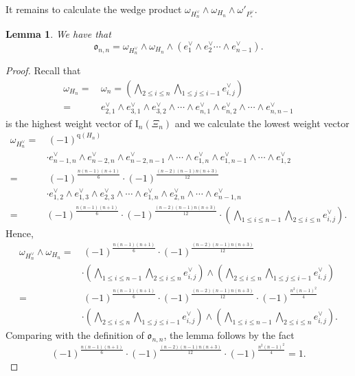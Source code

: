 \documentclass[12pt, a4paper]{amsart}
\newcommand{\RI}{{\mathrm {I}}}
\theoremstyle{Theorem}
\theoremstyle{Theorem}
\theoremstyle{Theorem}
\theoremstyle{Theorem}
\newtheorem{lemp}[prp]{Lemma}
\theoremstyle{Plain}
\theoremstyle{Definition}
\begin{document}
	It remains to calculate the wedge product $\omega_{H^{\vee}_n}\wedge\omega_{H_n}\wedge\omega'_{P^{\vee}_{\circ}}$. 
	
	\begin{lemp}\label{lemB}
		We have that
		\[
		\mathfrak{o}_{n,n}=\omega_{H^{\vee}_n}\wedge\omega_{H_n}\wedge\left(e_{1}^{\vee}\wedge e_{2}^{\vee}\cdots\wedge e_{n-1}^{\vee}\right).
		\]
	\end{lemp}
	
	\begin{proof}
		Recall that
		\[
		\begin{aligned}
			\omega_{H_n}=&\,\omega_n=\left(\bigwedge_{2\leq i\leq n}\bigwedge_{1\leq j\leq i-1}e_{i,j}^{\vee}\right)\\
			=&\,e_{2,1}^{\vee}\wedge e_{3,1}^{\vee}\wedge e_{3,2}^{\vee}\wedge\cdots\wedge e_{n,1}^{\vee}\wedge e_{n,2}^{\vee}\wedge\cdots\wedge e_{n,n-1}^{\vee}
		\end{aligned}
		\]
		is the highest weight vector of $\RI_n(\Xi_n)$ and we calculate the lowest weight vector
		\[
		\begin{aligned}
			\omega_{H_n^{\vee}}=&\,(-1)^{\mathrm{q}(H_n)}\\
			&\cdot e_{n-1,n}^{\vee}\wedge e_{n-2,n}^{\vee}\wedge e_{n-2,n-1}^{\vee}\wedge\cdots\wedge e_{1,n}^{\vee}\wedge e_{1,n-1}^{\vee}\wedge\cdots\wedge e_{1,2}^{\vee}\\
			=&\,(-1)^{\frac{n(n-1)(n+1)}{6}}\cdot(-1)^{\frac{(n-2)(n-1)n(n+3)}{12}}\\
			&\cdot e_{1,2}^{\vee}\wedge e_{1,3}^{\vee}\wedge e_{2,3}^{\vee}\wedge\cdots\wedge e_{1,n}^{\vee}\wedge e_{2,n}^{\vee}\wedge\cdots \wedge e_{n-1,n}^{\vee}\\
			=&(-1)^{\frac{n(n-1)(n+1)}{6}}\cdot(-1)^{\frac{(n-2)(n-1)n(n+3)}{12}}\cdot\left(\bigwedge_{1\leq i\leq n-1}\bigwedge_{2\leq i\leq n}e_{i,j}^{\vee}\right).
		\end{aligned}
		\]
		Hence,
		\[
		\begin{aligned}
			\omega_{H_n^{\vee}}\wedge\omega_{H_n}=&\,(-1)^{\frac{n(n-1)(n+1)}{6}}\cdot(-1)^{\frac{(n-2)(n-1)n(n+3)}{12}}\\
			&\cdot\left(\bigwedge_{1\leq i\leq n-1}\bigwedge_{2\leq i\leq n}e_{i,j}^{\vee}\right)\wedge\left(\bigwedge_{2\leq i\leq n}\bigwedge_{1\leq j\leq i-1}e_{i,j}^{\vee}\right)\\
			=&\,(-1)^{\frac{n(n-1)(n+1)}{6}}\cdot(-1)^{\frac{(n-2)(n-1)n(n+3)}{12}}\cdot(-1)^{\frac{n^2(n-1)^2}{4}}\\
			&\cdot \left(\bigwedge_{2\leq i\leq n}\bigwedge_{1\leq j\leq i-1}e_{i,j}^{\vee}\right)\wedge\left(\bigwedge_{1\leq i\leq n-1}\bigwedge_{2\leq i\leq n}e_{i,j}^{\vee}\right).
		\end{aligned}
		\]
		Comparing with the definition of $\mathfrak{o}_{n,n}$, the lemma follows by the fact
		\[
		(-1)^{\frac{n(n-1)(n+1)}{6}}\cdot(-1)^{\frac{(n-2)(n-1)n(n+3)}{12}}\cdot(-1)^{\frac{n^2(n-1)^2}{4}}=1.
		\]
	\end{proof}
	
\end{document}
